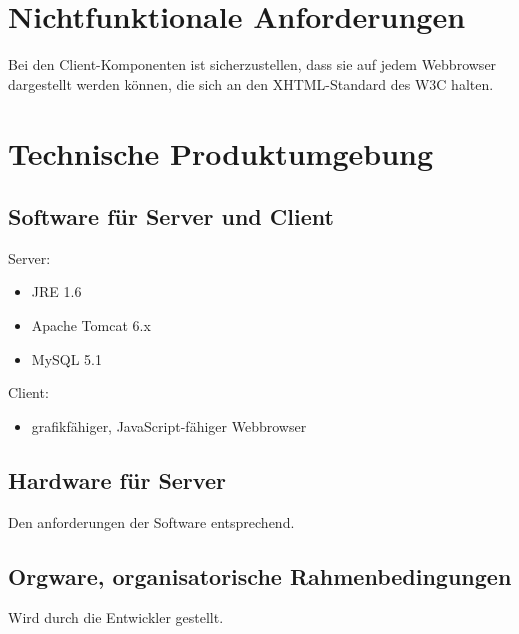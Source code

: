 \documentclass[a4paper,11pt]{article}             %
\begin{document}




\section{Nichtfunktionale Anforderungen}
Bei den Client-Komponenten ist sicherzustellen, dass sie auf jedem Webbrowser dargestellt werden können, die sich an den XHTML-Standard des W3C halten.
\section{Technische Produktumgebung}
\subsection{Software für Server und Client}
Server:
\begin{itemize}
\item JRE 1.6
\item Apache Tomcat 6.x 
\item MySQL 5.1
\end{itemize}
Client:
\begin{itemize}
\item grafikfähiger, JavaScript-fähiger Webbrowser
\end{itemize}
\subsection{Hardware für Server}
Den anforderungen der Software entsprechend.
\subsection{Orgware, organisatorische Rahmenbedingungen}
Wird durch die Entwickler gestellt.
\end{document}
